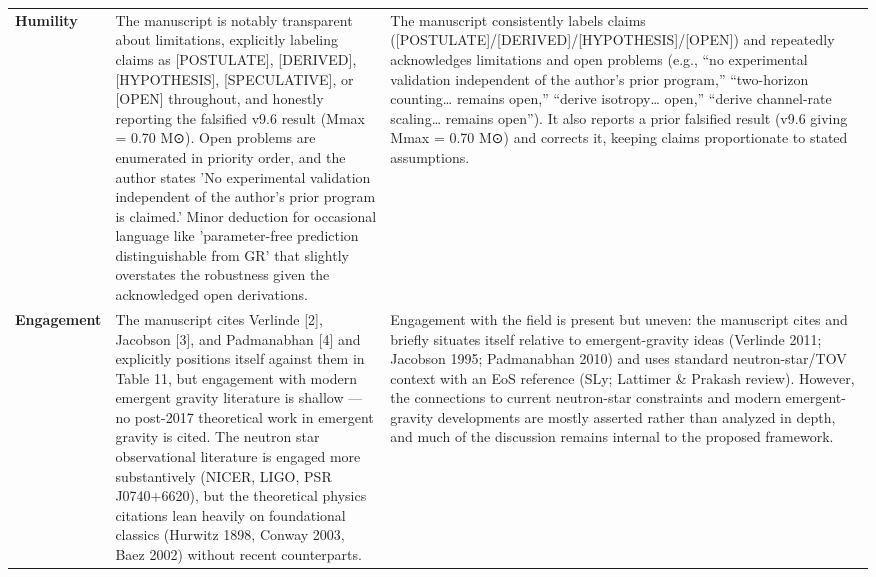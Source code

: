 \documentclass[11pt]{article}
\begin{document}
\begin{longtable}{@{} p{2.2cm} p{6.3cm} p{6.3cm} @{}}
\rowcolor{rowgray}
\textbf{Humility} &
The manuscript is notably transparent about limitations, explicitly labeling claims as [POSTULATE], [DERIVED], [HYPOTHESIS], [SPECULATIVE], or [OPEN] throughout, and honestly reporting the falsified v9.6 result (Mmax = 0.70 M⊙). Open problems are enumerated in priority order, and the author states 'No experimental validation independent of the author's prior program is claimed.' Minor deduction for occasional language like 'parameter-free prediction distinguishable from GR' that slightly overstates the robustness given the acknowledged open derivations. &
The manuscript consistently labels claims ([POSTULATE]/[DERIVED]/[HYPOTHESIS]/[OPEN]) and repeatedly acknowledges limitations and open problems (e.g., “no experimental validation independent of the author’s prior program,” “two-horizon counting… remains open,” “derive isotropy… open,” “derive channel-rate scaling… remains open”). It also reports a prior falsified result (v9.6 giving Mmax = 0.70 M⊙) and corrects it, keeping claims proportionate to stated assumptions. \\[6pt]

\textbf{Engagement} &
The manuscript cites Verlinde [2], Jacobson [3], and Padmanabhan [4] and explicitly positions itself against them in Table 11, but engagement with modern emergent gravity literature is shallow — no post-2017 theoretical work in emergent gravity is cited. The neutron star observational literature is engaged more substantively (NICER, LIGO, PSR J0740+6620), but the theoretical physics citations lean heavily on foundational classics (Hurwitz 1898, Conway 2003, Baez 2002) without recent counterparts. &
Engagement with the field is present but uneven: the manuscript cites and briefly situates itself relative to emergent-gravity ideas (Verlinde 2011; Jacobson 1995; Padmanabhan 2010) and uses standard neutron-star/TOV context with an EoS reference (SLy; Lattimer \& Prakash review). However, the connections to current neutron-star constraints and modern emergent-gravity developments are mostly asserted rather than analyzed in depth, and much of the discussion remains internal to the proposed framework. \\[6pt]


\end{longtable}
\end{document}
